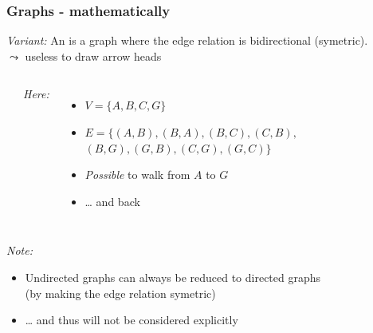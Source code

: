 \begin{frame}[fragile]\frametitle{Graphs - mathematically}

\emph{Variant:} An  is a graph where the edge relation
is bidirectional (symetric).\\
$\leadsto$ useless to draw arrow heads

  \vspace{5mm}
\begin{columns}[t]
  \begin{center}
\end{center}
  \emph{Here:}
  \begin{itemize}
  \item $V = \{A, B, C, G\}$
  \item $E = \{(A, B), (B, A), (B, C), (C, B),$
    $(B, G), (G, B), (C, G), (G, C) \}$
  \item \emph{Possible} to walk from $A$ to $G$
  \item \dots{} and back
  \end{itemize}
\end{columns}

\emph{Note:}
\begin{itemize}
\item Undirected graphs can always be reduced to directed graphs\\
  (by making the edge relation symetric)
\item \dots{} and thus will not be considered explicitly
\end{itemize}

\end{frame}




